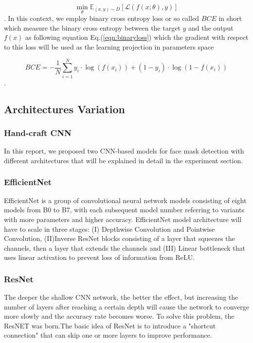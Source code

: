 \documentclass[conference]{IEEEtran}
\begin{document}
\begin{equation}
    \min_{\theta} \mathbb{E}_{\left ( x,y \right ) \sim  D} \left [ \mathcal{L}\left ( f(x;\theta), y \right ) \right ]
\end{equation}
. In this context, we employ binary cross entropy loss or so called $BCE$ in short which measure the binary cross entropy between the target $y$ and the output $f(x)$ as following equation
Eq.(\ref{eqn:binaryloss}) which the gradient with respect to this loss will be used as the learning projection in parameters space 

\begin{equation}
\label{eqn:binaryloss}
BCE=-\frac{1}{N} \sum_{i=1}^{N} y_{i} \cdot \log \left(f\left(x_{i}\right)\right)+\left(1-y_{i}\right) \cdot \log \left(1-f\left(x_{i}\right)\right)
\end{equation}.

\subsection{Architectures Variation}

\subsubsection{Hand-craft CNN}
In this report, we proposed two CNN-based models for face mask detection with different architectures that will be explained in detail in the experiment section.

\subsubsection{EfficientNet}
EfficientNet is a group of convolutional neural network models consisting of eight models from B0 to B7, with each subsequent model number referring to variants with more parameters and higher accuracy. EfficientNet model architecture will have to scale in three stages: (I) Depthwise Convolution and Pointwise Convolution, (II)Inverse ResNet blocks consisting of a layer that squeezes the channels, then a layer that extends the channels and (III) Linear bottleneck that uses linear activation to prevent loss of information from ReLU.\cite{DBLP:journals/corr/abs-1905-11946}

\subsubsection{ResNet}
The deeper the shallow CNN network, the better the effect, but increasing the number of layers after reaching a certain depth will cause the network to converge more slowly and the accuracy rate becomes worse. To solve this problem, the ResNET was born.The basic idea of ResNet is to introduce a "shortcut connection" that can skip one or more layers to improve performance.
\end{document}
